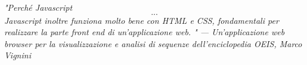 \documentclass[twoside,openright,titlepage,fleqn,
,	headinclude,12pt,a4paper,BCOR5mm,footinclude,table]{scrbook}
\theoremstyle{definition}
\begin{document}
\frenchspacing
\raggedbottom
{}
\pagestyle{plain}




\pagestyle{scrheadings}
\tableofcontents
\listoffigures
\lstlistoflistings

\begingroup
\let\clearpage\relax
\let\cleardoublepage\relax
\let\cleardoublepage\relax

\vspace*{8ex}

\listoftables
\endgroup 

\cleardoublepage
\thispagestyle{empty}

\begin{flushright}
\null{}
\emph{"Perché Javascript \\
\[...\]Javascript inoltre funziona molto bene con HTML e CSS, fondamentali per realizzare la parte front end di un’applicazione web. " \break ---  Un'applicazione web browser per la visualizzazione e analisi di sequenze dell'enciclopedia OEIS, Marco Vignini} \null
\end{flushright}
\cleardoublepage






\begin{appendices}

\end{appendices}








\end{document}
